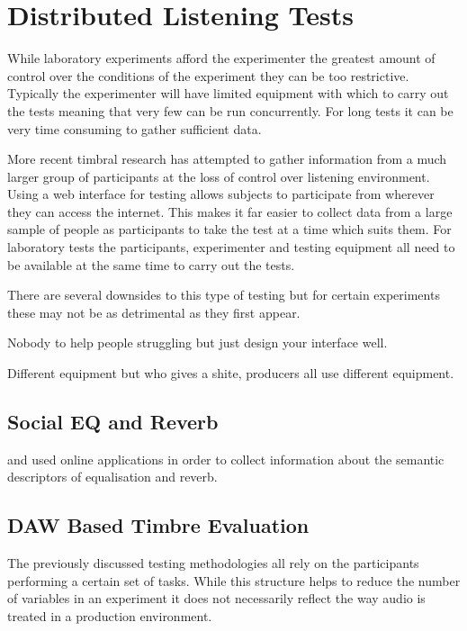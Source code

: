 \section{Distributed Listening Tests}
\label{sec:ListeningTests-DistributedListeningTests}
	While laboratory experiments afford the experimenter the greatest amount of control over the conditions of the
	experiment they can be too restrictive. Typically the experimenter will have limited equipment with which to carry
	out the tests meaning that very few can be run concurrently. For long tests it can be very time consuming to gather
	sufficient data.
	
	More recent timbral research has attempted to gather information from a much larger group of participants at the
	loss of control over listening environment. Using a web interface for testing allows subjects to participate from
	wherever they can access the internet. This makes it far easier to collect data from a large sample of people as
	participants to take the test at a time which suits them. For laboratory tests the participants, experimenter and
	testing equipment all need to be available at the same time to carry out the tests.

	There are several downsides to this type of testing but for certain experiments these may not be as detrimental as
	they first appear.

	\note
	{
		Nobody to help people struggling but just design your interface well.

		Different equipment but who gives a shite, producers all use different equipment.
	}

	\subsection{Social EQ and Reverb}
	\label{sec:ListeningTests-DistributedListeningTests-SocialEQandReverb}
		\citet{cartwright2013socialeq} and \citet{seetharaman2014crowdsourcing} used online applications in order to
		collect information about the semantic descriptors of equalisation and reverb.

	\subsection{DAW Based Timbre Evaluation} %
	\label{sec:ListeningTests-DistributedListeningTests-DAWBasedTimbreEvaluation}
		The previously discussed testing methodologies all rely on the participants performing a certain set of
		tasks. While this structure helps to reduce the number of variables in an experiment it does not necessarily
		reflect the way audio is treated in a production environment.

